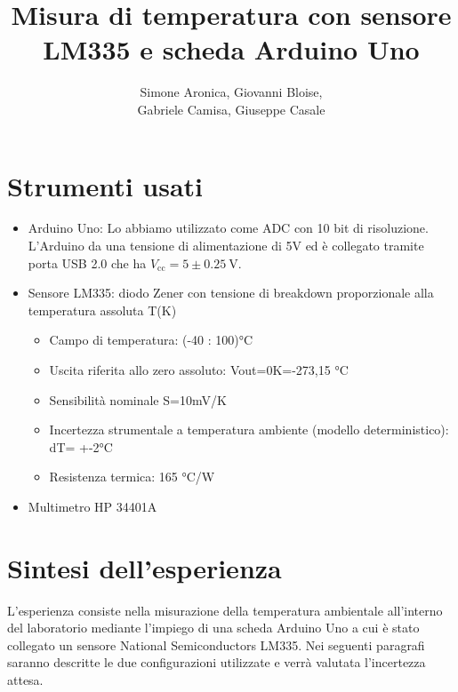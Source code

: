 \documentclass{article}
\title{Misura di temperatura con
sensore LM335 e
scheda Arduino Uno}
\author{Simone Aronica, Giovanni Bloise, \\
Gabriele Camisa, Giuseppe Casale}
\date{}
\begin{document}
\maketitle
\tableofcontents
\pagebreak

\section{Strumenti usati}
\begin{itemize}
    \item Arduino Uno:
    Lo abbiamo utilizzato come ADC con 10 bit di risoluzione. L'Arduino da una tensione di alimentazione di 5V ed è collegato tramite porta USB 2.0 che ha $V_{\text{cc}} = 5 \pm \SI{0.25}{\volt}$.
    \item Sensore LM335:
    diodo Zener con tensione di breakdown proporzionale alla temperatura assoluta T(K)
    \begin{itemize}
        \item Campo di temperatura: (-40 : 100)°C
        \item Uscita riferita allo zero assoluto: Vout=0K=-273,15 °C
        \item Sensibilità nominale S=10mV/K
        \item Incertezza strumentale a temperatura ambiente (modello deterministico): dT= +-2°C
        \item Resistenza termica: 165 °C/W
    \end{itemize}
    \item Multimetro HP 34401A
\end{itemize}

\section{Sintesi dell'esperienza}
L'esperienza consiste nella misurazione della temperatura ambientale all'interno del laboratorio mediante l'impiego di una scheda Arduino Uno a cui è stato collegato un sensore National Semiconductors LM335. Nei seguenti paragrafi saranno descritte le due configurazioni utilizzate e verrà valutata l'incertezza attesa.
\end{document}
